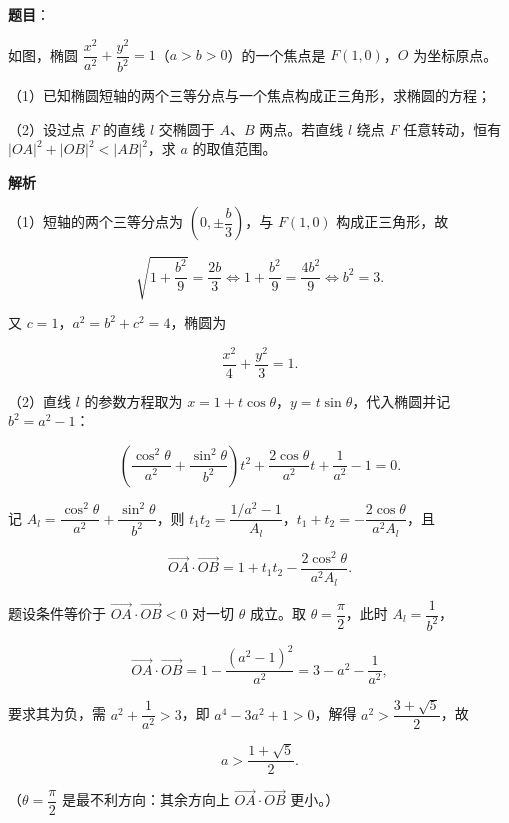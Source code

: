 \begin{answer}

\textbf{题目}：

如图，椭圆 $\dfrac{x^2}{a^2}+\dfrac{y^2}{b^2}=1$（$a>b>0$）的一个焦点是 $F(1,0)$，$O$ 为坐标原点。

（1）已知椭圆短轴的两个三等分点与一个焦点构成正三角形，求椭圆的方程；

（2）设过点 $F$ 的直线 $l$ 交椭圆于 $A$、$B$ 两点。若直线 $l$ 绕点 $F$ 任意转动，恒有 $|OA|^2+|OB|^2<|AB|^2$，求 $a$ 的取值范围。
\nopagebreak[4]
\begin{center}\end{center}
\nopagebreak[4]
\textbf{解析}

（1）短轴的两个三等分点为 $\left(0,\pm\dfrac b3\right)$，与 $F(1,0)$ 构成正三角形，故

\nopagebreak[4]
\[\sqrt{1+\frac{b^2}9}=\frac{2b}3\iff 1+\frac{b^2}9=\frac{4b^2}9\iff b^2=3.\]

又 $c=1$，$a^2=b^2+c^2=4$，椭圆为

\nopagebreak[4]
\[\frac{x^2}4+\frac{y^2}3=1.\]

（2）直线 $l$ 的参数方程取为 $x=1+t\cos\theta$，$y=t\sin\theta$，代入椭圆并记 $b^2=a^2-1$：

\nopagebreak[4]
\[\left(\frac{\cos^2\theta}{a^2}+\frac{\sin^2\theta}{b^2}\right)t^2+\frac{2\cos\theta}{a^2}t+\frac1{a^2}-1=0.\]

记 $A_l=\dfrac{\cos^2\theta}{a^2}+\dfrac{\sin^2\theta}{b^2}$，则 $t_1t_2=\dfrac{1/a^2-1}{A_l}$，$t_1+t_2=-\dfrac{2\cos\theta}{a^2A_l}$，且

\nopagebreak[4]
\[\overrightarrow{OA}\cdot\overrightarrow{OB}=1+t_1t_2-\frac{2\cos^2\theta}{a^2A_l}.\]

题设条件等价于 $\overrightarrow{OA}\cdot\overrightarrow{OB}<0$ 对一切 $\theta$ 成立。取 $\theta=\dfrac{\pi}2$，此时 $A_l=\dfrac1{b^2}$，

\nopagebreak[4]
\[\overrightarrow{OA}\cdot\overrightarrow{OB}=1-\frac{(a^2-1)^2}{a^2}=3-a^2-\frac1{a^2},\]

要求其为负，需 $a^2+\dfrac1{a^2}>3$，即 $a^4-3a^2+1>0$，解得 $a^2>\dfrac{3+\sqrt5}2$，故

\nopagebreak[4]
\[a>\frac{1+\sqrt5}2.\]

（$\theta=\dfrac{\pi}2$ 是最不利方向：其余方向上 $\overrightarrow{OA}\cdot\overrightarrow{OB}$ 更小。）


\end{answer}
